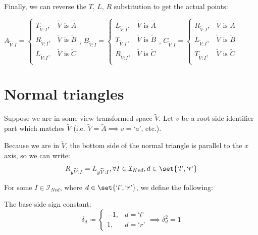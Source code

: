 \documentclass[a4paper,12pt]{article}
\newcommand{\HSindexpart}[1]{\text{`}#1\text{'}}
\newcommand{\HSview}[1][V]{\widetilde{#1}}
\newcommand{\HSA}[1][I]{A_{\HSview:#1}}
\newcommand{\HSB}[1][I]{B_{\HSview:#1}}
\newcommand{\HSC}[1][I]{C_{\HSview:#1}}
\newcommand{\HST}[1][I]{T_{\HSview:#1}}
\newcommand{\HSL}[1][I]{L_{\HSview:#1}}
\newcommand{\HSR}[1][I]{R_{\HSview:#1}}
\newcommand{\HSLy}[1][I]{L_{y\HSview:#1}}
\newcommand{\HSRy}[1][I]{R_{y\HSview:#1}}
\newcommand{\HSdelta}[1][d]{\delta_{#1}}
\theoremstyle{definition}
\theoremstyle{plain}
\begin{document}
	Finally, we can reverse the $T$, $L$, $R$ substitution to get the actual points:
	
	$\HSA = \begin{cases}
		\HST, & \HSview \text{ is } \HSview[A]\\
		\HSR, & \HSview \text{ is } \HSview[B]\\
		\HSL, & \HSview \text{ is } \HSview[C]\\
  \end{cases}$,\quad\quad
	$\HSB = \begin{cases}
		\HSL, & \HSview \text{ is } \HSview[A]\\
		\HST, & \HSview \text{ is } \HSview[B]\\
		\HSR, & \HSview \text{ is } \HSview[C]\\
  \end{cases}$,\quad\quad
	$\HSC = \begin{cases}
		\HSR, & \HSview \text{ is } \HSview[A]\\
		\HSL, & \HSview \text{ is } \HSview[B]\\
		\HST, & \HSview \text{ is } \HSview[C]\\
  \end{cases}$
	
	\pagebreak

	\section{Normal triangles}
	
	Suppose we are in some view transformed space $\HSview$.
	Let $v$ be a root side identifier part which matches $\HSview$ (i.e. $\HSview = \widetilde{A} \implies v = \HSindexpart{a}$, etc.).

	Because we are in $\HSview$, the bottom side of the normal triangle is parallel to the $x$ axis, so we can write:
	\begin{equation}
		\HSRy = \HSLy, \forall I \in \mathcal{I}_{Nvd}, d \in \set{\HSindexpart{l}, \HSindexpart{r}} \label{normal-left-right-identity}
	\end{equation}

	For some $I \in \mathcal{I}_{Nvd}$, where $d \in \set{\HSindexpart{l}, \HSindexpart{r}}$, we define the following:
	
	The base side sign constant:
	$$\HSdelta \coloneqq \begin{cases}-1,& d = \HSindexpart{l}\\1,& d = \HSindexpart{r}\end{cases} \implies \HSdelta^2 = 1$$
\end{document}
